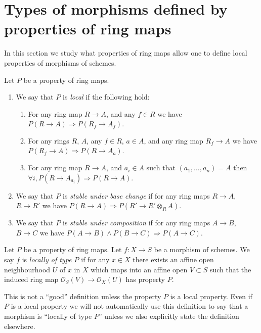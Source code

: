 \section{Types of morphisms defined by properties of ring maps}
\label{section-properties-ring-maps}

\noindent
In this section we study what properties of ring maps
allow one to define local properties of morphisms of schemes.

\begin{definition}
\label{definition-property-local}
Let $P$ be a property of ring maps.
\begin{enumerate}
\item We say that $P$ is {\it local} if the following hold:
\begin{enumerate}
\item For any ring map $R \to A$, and any $f \in R$ we have
$P(R \to A) \Rightarrow P(R_f \to A_f)$.
\item For any rings $R$, $A$, any $f \in R$, $a\in A$, and any ring map
$R_f \to A$ we have $P(R_f \to A) \Rightarrow P(R \to A_a)$.
\item For any ring map $R \to A$, and $a_i \in A$ such that
$(a_1, \ldots, a_n) = A$ then
$\forall i, P(R \to A_{a_i}) \Rightarrow P(R \to A)$.
\end{enumerate}
\item We say that $P$ is {\it stable under base change} if for any
ring maps $R \to A$, $R \to R'$ we have
$P(R \to A) \Rightarrow P(R' \to R' \otimes_R A)$.
\item We say that $P$ is {\it stable under composition} if for any
ring maps $A \to B$, $B \to C$ we have
$P(A \to B) \wedge P(B \to C) \Rightarrow P(A \to C)$.
\end{enumerate}
\end{definition}

\begin{definition}
\label{definition-locally-P}
Let $P$ be a property of ring maps.
Let $f : X \to S$ be a morphism of schemes.
We say $f$ is {\it locally of type $P$} if for any $x \in X$
there exists an affine open neighbourhood $U$ of $x$
in $X$ which maps into an affine open $V \subset S$ such that
the induced ring map $\mathcal{O}_S(V) \to \mathcal{O}_X(U)$
has property $P$.
\end{definition}

\noindent
This is not a ``good'' definition unless the property $P$ is
a local property. Even if $P$ is a local property we will not
automatically use this definition to say that a morphism is
``locally of type $P$'' unless we also explicitly state the
definition elsewhere.

